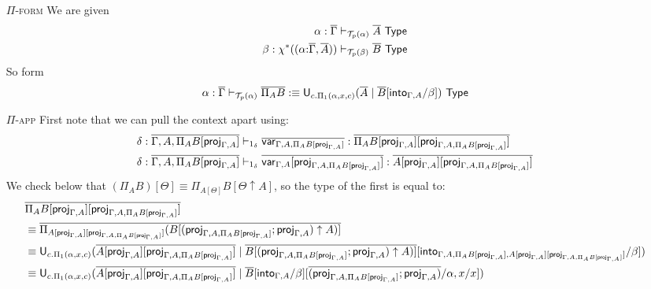 \documentclass[10pt]{article}
\theoremstyle{definition}
\newcommand{\yields}{\vdash}
\newcommand{\TYPE}{\,\,\mathsf{Type}}
\newcommand{\telety}[3]{\ensuremath{(#1{:}#2,#3)}}
\newcommand\U[3]{\ensuremath{\mathsf{U}_{#1}(#2 \mid #3)}}
\newcommand\St[2]{\ensuremath{{#1}^*(#2)}}
\newcommand\El[2]{\mathcal{T}_{#1}(#2)}
\begin{document}
\begin{enumerate}
\item[\textsc{$\Pi$-form}] We are given
\begin{align*}
\alpha : \upstairs{\Gamma} &\yields_{\El{p}{\alpha}} \upstairs{A} \TYPE \\
\beta : \St{\chi}{\telety{\alpha}{\upstairs{\Gamma}}{\upstairs{A}}} &\yields_{\El{p}{\beta}} \upstairs{B} \TYPE
\end{align*}
So form
\begin{align*}
\alpha : \upstairs{\Gamma} \yields_{\El{p}{\alpha}} \upstairs{\Pi_A B} :\equiv \U{c. \Pi_1(\alpha,x,c)}{\upstairs{A}}{\upstairs{B}[\into{\Gamma, A}/\beta]} \TYPE
\end{align*}

\item[\textsc{$\Pi$-app}] First note that we can pull the context apart using:
\begin{align*}
\delta : \upstairs{\Gamma, A, \Pi_A B[\proj{\Gamma, A}]} &\yields_{1_\delta} \upstairs{\var{\Gamma, A, \Pi_A B[\proj{\Gamma, A}]}} : \upstairs{\Pi_A B[\proj{\Gamma, A}][\proj{\Gamma, A, \Pi_A B[\proj{\Gamma, A}]}]} \\ 
\delta : \upstairs{\Gamma, A, \Pi_A B[\proj{\Gamma, A}]} &\yields_{1_\delta} \upstairs{\var{\Gamma, A}[\proj{\Gamma, A, \Pi_A B[\proj{\Gamma, A}]}]} : \upstairs{A[\proj{\Gamma, A}][\proj{\Gamma, A, \Pi_A B[\proj{\Gamma, A}]}]} \\ 
\end{align*}
We check below that $(\Pi_A B)[\Theta] \equiv \Pi_{A[\Theta]} B[\Theta \uparrow A]$, so the type of the first is equal to:
\begin{align*}
&\upstairs{\Pi_A B[\proj{\Gamma, A}][\proj{\Gamma, A, \Pi_A B[\proj{\Gamma, A}]}]} \\
&\equiv \upstairs{\Pi_{A[\proj{\Gamma, A}][\proj{\Gamma, A, \Pi_A B[\proj{\Gamma, A}]}]} (B[(\proj{\Gamma, A, \Pi_A B[\proj{\Gamma, A}]};\proj{\Gamma, A}) \uparrow A)]} \\
&\equiv \U{c. \Pi_1(\alpha,x,c)}{\upstairs{A[\proj{\Gamma, A}][\proj{\Gamma, A, \Pi_A B[\proj{\Gamma, A}]}]}}{\upstairs{B[(\proj{\Gamma, A, \Pi_A B[\proj{\Gamma, A}]};\proj{\Gamma, A}) \uparrow A)]}[\into{\Gamma, A, \Pi_A B[\proj{\Gamma, A}], A[\proj{\Gamma, A}][\proj{\Gamma, A, \Pi_A B[\proj{\Gamma, A}]}]}/\beta]} \\
&\equiv \U{c. \Pi_1(\alpha,x,c)}{\upstairs{A[\proj{\Gamma, A}][\proj{\Gamma, A, \Pi_A B[\proj{\Gamma, A}]}]}}{\upstairs{B}[\into{\Gamma, A}/\beta][\upstairs{(\proj{\Gamma, A, \Pi_A B[\proj{\Gamma, A}]};\proj{\Gamma, A})}/\alpha, x/x]}

\end{align*}
\end{enumerate}
\end{document}
